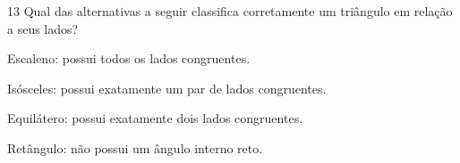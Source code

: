 





\pagebreak

\num{13} Qual das alternativas a seguir classifica corretamente um triângulo em
relação a seus lados?

\begin{escolha}
\item Escaleno: possui todos os lados congruentes.
\item Isósceles: possui exatamente um par de lados congruentes.
\item Equilátero: possui exatamente dois lados congruentes.
\item Retângulo: não possui um ângulo interno reto.
\end{escolha}






